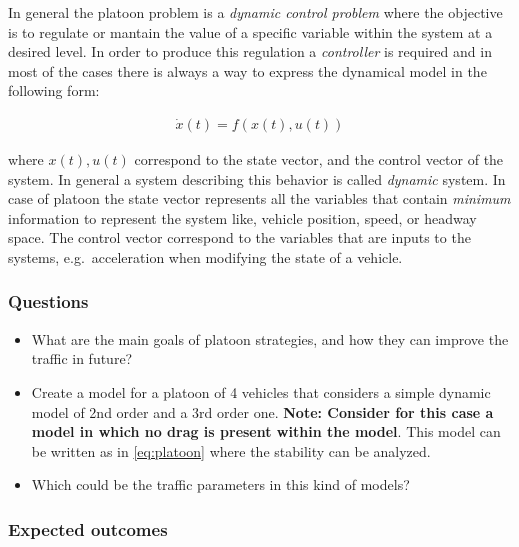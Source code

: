 \documentclass[]{book}
\providecommand{\tightlist}{%
  \setlength{\itemsep}{0pt}\setlength{\parskip}{0pt}}
\theoremstyle{definition}
\theoremstyle{definition}
\theoremstyle{definition}
\theoremstyle{remark}
\begin{document}
In general the platoon problem is a \emph{dynamic control problem} where
the objective is to regulate or mantain the value of a specific variable
within the system at a desired level. In order to produce this
regulation a \emph{controller} is required and in most of the cases
there is always a way to express the dynamical model in the following
form:

\begin{align}
\dot{x}(t) = f(x(t), u(t)) \label{eq:platoon}
\end{align}

where \(x(t), u(t)\) correspond to the state vector, and the control
vector of the system. In general a system describing this behavior is
called \emph{dynamic} system. In case of platoon the state vector
represents all the variables that contain \emph{minimum} information to
represent the system like, vehicle position, speed, or headway space.
The control vector correspond to the variables that are inputs to the
systems, e.g.~acceleration when modifying the state of a vehicle.

\hypertarget{questions-4}{%
\subsubsection*{Questions}\label{questions-4}}

\begin{itemize}
\tightlist
\item
  What are the main goals of platoon strategies, and how they can
  improve the traffic in future?
\item
  Create a model for a platoon of 4 vehicles that considers a simple
  dynamic model of 2nd order and a 3rd order one. \textbf{Note: Consider
  for this case a model in which no drag is present within the model}.
  This model can be written as in \eqref{eq:platoon} where the stability
  can be analyzed.
\item
  Which could be the traffic parameters in this kind of models?
\end{itemize}

\hypertarget{expected-outcomes-4}{%
\subsubsection*{Expected outcomes}\label{expected-outcomes-4}}
\end{document}
